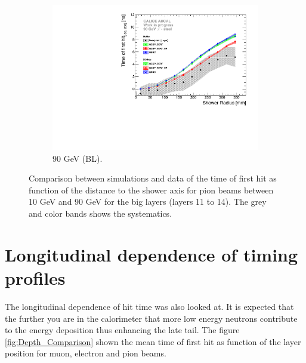 \begin{figure}[htbp!]
\begin{subfigure}[t]{0.5\textwidth}
		\includegraphics[width=1\textwidth]{chap5/fig_AHCAL_timing/Pions/ComparisonToSim/Time_Radius_90GeV_BL.pdf}
		\caption{90 GeV (BL).} \label{fig:Radius_BL_SimData_90GeV}
	\end{subfigure}
	\caption{Comparison between simulations and data of the time of first hit as function of the distance to the shower axis for pion beams between 10 GeV and 90 GeV for the big layers (layers 11 to 14). The grey and color bands shows the systematics.}
	\label{fig:Radius_BL_SimData_Comparison}
\end{figure}

\section{Longitudinal dependence of timing profiles}

The longitudinal dependence of hit time was also looked at. It is expected that the further you are in the calorimeter that more low energy neutrons contribute to the energy deposition thus enhancing the late tail. The figure \ref{fig:Depth_Comparison} shown the mean time of first hit as function of the layer position for muon, electron and pion beams.

